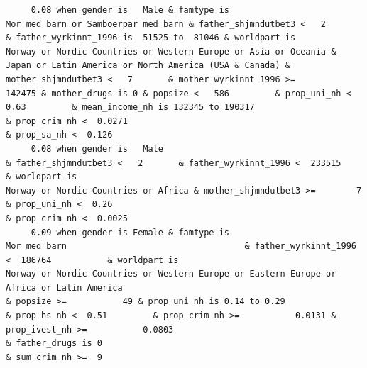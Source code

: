 \documentclass[
  letterpaper,
  DIV=11,
  numbers=noendperiod]{scrreprt}
\begin{document}
\begin{verbatim}
     0.08 when gender is   Male & famtype is                              Mor med barn or Samboerpar med barn & father_shjmndutbet3 <   2       & father_wyrkinnt_1996 is  51525 to  81046 & worldpart is            Norway or Nordic Countries or Western Europe or Asia or Oceania & Japan or Latin America or North America (USA & Canada) & mother_shjmndutbet3 <   7       & mother_wyrkinnt_1996 >=           142475 & mother_drugs is 0 & popsize <   586         & prop_uni_nh <  0.63         & mean_income_nh is 132345 to 190317                              & prop_crim_nh <  0.0271                                                                                                                  & prop_sa_nh <  0.126                                                                                                                                               
     0.08 when gender is   Male                                                                               & father_shjmndutbet3 <   2       & father_wyrkinnt_1996 <  233515           & worldpart is                                                                                                Norway or Nordic Countries or Africa & mother_shjmndutbet3 >=        7                                                                                          & prop_uni_nh <  0.26                                                                           & prop_crim_nh <  0.0025                                                                                                                                                                                                                                                                                      
     0.09 when gender is Female & famtype is                                                     Mor med barn                                   & father_wyrkinnt_1996 <  186764           & worldpart is                                           Norway or Nordic Countries or Western Europe or Eastern Europe or Africa or Latin America                                                                                                  & popsize >=           49 & prop_uni_nh is 0.14 to 0.29                                      & prop_hs_nh <  0.51         & prop_crim_nh >=           0.0131 & prop_ivest_nh >=           0.0803                                                                                                                          & father_drugs is 0                                                                        & sum_crim_nh >=  9

\end{verbatim}
\end{document}
